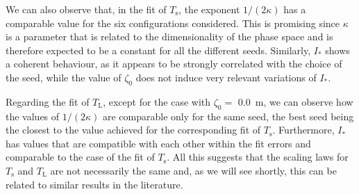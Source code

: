 We can also observe that, in the fit of $T_\mathrm{s}$, the exponent $1/(2\kappa)$ has a comparable value for the six configurations considered. This is promising since $\kappa$ is a parameter that is related to the dimensionality of the phase space and is therefore expected to be a constant for all the different seeds. Similarly, $I_\ast$ shows a coherent behaviour, as it appears to be strongly correlated with the choice of the seed, while the value of $\zeta_0$ does not induce very relevant variations of $I_\ast$.

Regarding the fit of $T_\mathrm{L}$, except for the case with $\zeta_0 =$ \SI{0.0}{\metre}, we can observe how the values of $1/(2\kappa)$ are comparable only for the same seed, the best seed being the closest to the value achieved for the corresponding fit of $T_\mathrm{s}$. Furthermore, $I_\ast$ has values that are compatible with each other within the fit errors and comparable to the case of the fit of $T_\mathrm{s}$. All this suggests that the scaling laws for $T_\mathrm{s}$ and $T_\mathrm{L}$ are not necessarily the same and, as we will see shortly, this can be related to similar results in the literature. 


